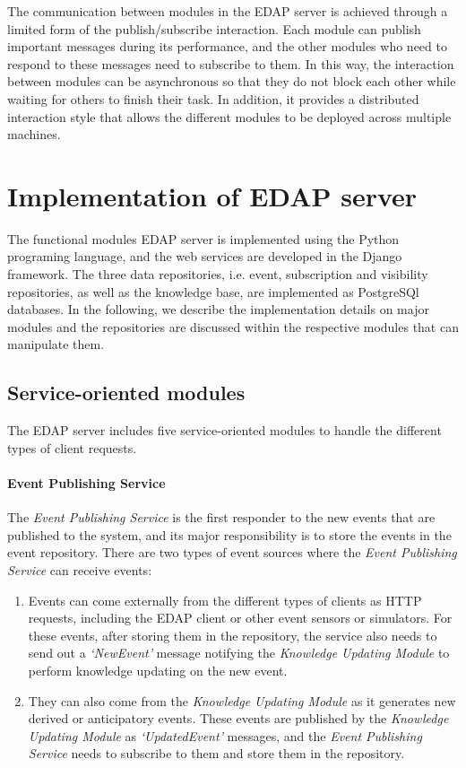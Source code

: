The communication between modules in the EDAP server is achieved through a limited form of the publish/subscribe interaction. Each module can publish important messages during its performance, and the other modules who need to respond to these messages need to subscribe to them. In this way, the interaction between modules can be asynchronous so that they do not block each other while waiting for others to finish their task. In addition, it provides a distributed interaction style that allows the different modules to be deployed across multiple machines. 

\section{Implementation of EDAP server} %
\label{sec:implementation_of_edap_server}
The functional modules EDAP server is implemented using the Python programing language, and the web services are developed in the Django framework. The three data repositories, i.e. event, subscription and visibility repositories, as well as the knowledge base, are implemented as PostgreSQl databases. In the following, we describe the implementation details on major modules and the repositories are discussed within the respective modules that can manipulate them. 

\subsection{Service-oriented modules} %
\label{sub:service_oriented_modules}
The EDAP server includes five service-oriented modules to handle the different types of client requests. 

\paragraph*{Event Publishing Service} %
\label{par:event_publishing_service}
The \emph{Event Publishing Service} is the first responder to the new events that are published to the system, and its major responsibility is to store the events in the event repository. There are two types of event sources where the \emph{Event Publishing Service} can receive events:

\begin{enumerate}
	\item Events can come externally from the different types of clients as HTTP requests, including the EDAP client or other event sensors or simulators. For these events, after storing them in the repository, the service also needs to send out a \emph{`NewEvent'} message notifying the \emph{Knowledge Updating Module} to perform knowledge updating on the new event.
	\item They can also come from the \emph{Knowledge Updating Module} as it generates new derived or anticipatory events. These events are published by the \emph{Knowledge Updating Module} as \emph{`UpdatedEvent'} messages, and the \emph{Event Publishing Service} needs to subscribe to them and store them in the repository. 
\end{enumerate}

